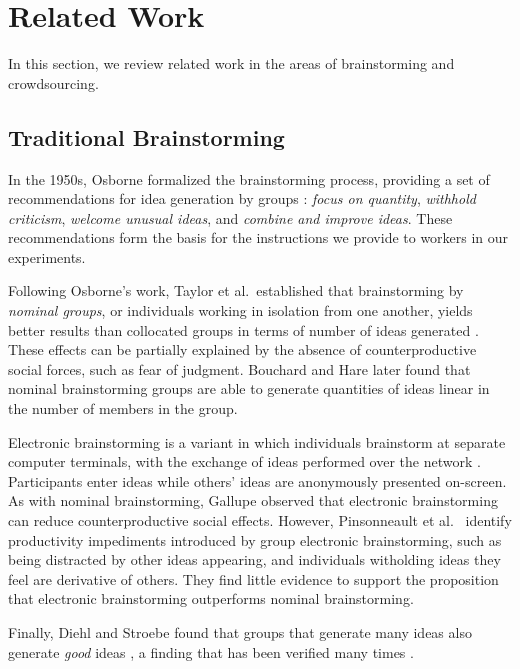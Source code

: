 \section{Related Work}
In this section, we review related work in the areas of brainstorming and crowdsourcing.

\subsection{Traditional Brainstorming}
In the 1950s, Osborne formalized the brainstorming process, providing a set of recommendations for idea generation by groups \cite{osborn_applied_1957}: \emph{focus on quantity}, \emph{withhold criticism}, \emph{welcome unusual ideas}, and \emph{combine and improve ideas}. These recommendations form the basis for the instructions we provide to workers in our experiments.

Following Osborne's work, Taylor et al.\ established that brainstorming by \emph{nominal groups}, or individuals working in isolation from one another, yields better results than collocated groups in terms of number of ideas generated \cite{taylor_does_1958}. These effects can be partially explained by the absence of counterproductive social forces, such as fear of judgment. Bouchard and Hare \cite{bouchard_jr_size_1970} later found that nominal brainstorming groups are able to generate quantities of ideas linear in the number of members in the group.

Electronic brainstorming is a variant in which individuals brainstorm at separate computer terminals, with the exchange of ideas performed over the network \cite{gallupe_electronic_1992}. Participants enter ideas while others' ideas are anonymously presented on-screen. As with nominal brainstorming, Gallupe \cite{gallupe_electronic_1992} observed that electronic brainstorming can reduce counterproductive social effects. However, Pinsonneault et al.\ \cite{pinsonneault_electronic_1999} identify productivity impediments introduced by group electronic brainstorming, such as being distracted by other ideas appearing, and individuals witholding ideas they feel are derivative of others. They find little evidence to support the proposition that electronic brainstorming outperforms nominal brainstorming.

Finally, Diehl and Stroebe found that groups that generate many ideas also generate \emph{good} ideas \cite{diehl_productivity_1987}, a finding that has been verified many times \cite{briggs1997quality, parnes1959effects, parnes_effects_1961, shah2003metrics, cross1996creativity}.


